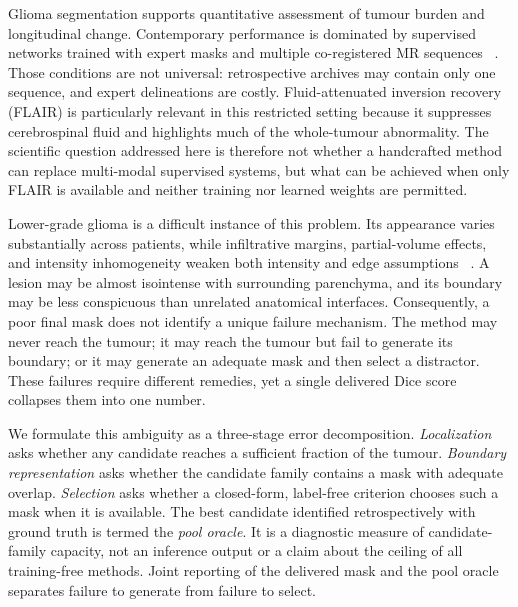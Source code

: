 \documentclass[11pt,a4paper]{article}
\begin{document}
Glioma segmentation supports quantitative assessment of tumour burden and
longitudinal change. Contemporary performance is dominated by supervised
networks trained with expert masks and multiple co-registered MR sequences
~\cite{havaei2017,isensee2021}. Those conditions are not universal: retrospective
archives may contain only one sequence, and expert delineations are costly.
Fluid-attenuated inversion recovery (FLAIR) is particularly relevant in this
restricted setting because it suppresses cerebrospinal fluid and highlights much
of the whole-tumour abnormality. The scientific question addressed here is
therefore not whether a handcrafted method can replace multi-modal supervised
systems, but what can be achieved when only FLAIR is available and neither
training nor learned weights are permitted.

Lower-grade glioma is a difficult instance of this problem. Its appearance varies
substantially across patients, while infiltrative margins, partial-volume effects,
and intensity inhomogeneity weaken both intensity and edge assumptions
~\cite{gordillo2013,bakas2017}. A lesion may be almost isointense with surrounding
parenchyma, and its boundary may be less conspicuous than unrelated anatomical
interfaces. Consequently, a poor final mask does not identify a unique failure
mechanism. The method may never reach the tumour; it may reach the tumour but fail
to generate its boundary; or it may generate an adequate mask and then select a
distractor. These failures require different remedies, yet a single delivered
Dice score collapses them into one number.

We formulate this ambiguity as a three-stage error decomposition. \emph{Localization}
asks whether any candidate reaches a sufficient fraction of the tumour.
\emph{Boundary representation} asks whether the candidate family contains a mask
with adequate overlap. \emph{Selection} asks whether a closed-form, label-free
criterion chooses such a mask when it is available. The best candidate identified
retrospectively with ground truth is termed the \emph{pool oracle}. It is a
diagnostic measure of candidate-family capacity, not an inference output or a
claim about the ceiling of all training-free methods. Joint reporting of the
delivered mask and the pool oracle separates failure to generate from failure to
select.
\end{document}
